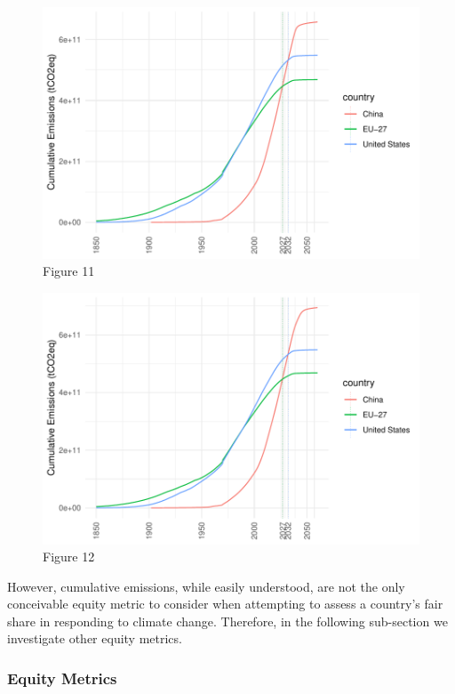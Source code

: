 \documentclass[
  12pt,
]{article}
\numberwithin{equation}{section}
\numberwithin{table}{section}
\numberwithin{figure}{section}
\begin{document}
\begin{figure}
\centering
\includegraphics{Paper_files/figure-latex/unnamed-chunk-11-1.pdf}
\caption{Figure 11}
\end{figure}

\begin{figure}
\centering
\includegraphics{Paper_files/figure-latex/unnamed-chunk-12-1.pdf}
\caption{Figure 12}
\end{figure}

However, cumulative emissions, while easily understood, are not the only
conceivable equity metric to consider when attempting to assess a
country's fair share in responding to climate change. Therefore, in the
following sub-section we investigate other equity metrics.

\hypertarget{equity-metrics}{%
\subsubsection{Equity Metrics}\label{equity-metrics}}
\end{document}
